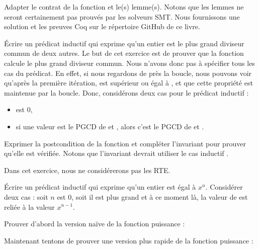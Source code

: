 

Adapter le contrat de la fonction et le(s) lemme(s). Notons que les lemmes ne
seront certainement pas prouvés par les solveurs SMT. Nous fournissons une solution
et les preuves Coq sur le répertoire GitHub de ce livre.





Écrire un prédicat inductif qui exprime qu'un entier est le plus grand diviseur
commun de deux autres. Le but de cet exercice est de prouver que la fonction
 calcule le plus grand diviseur commun. Nous n'avons donc pas
à spécifier tous les cas du prédicat. En effet, si nous regardons de près la boucle,
nous pouvons voir qu'après la première itération,  est supérieur ou
égal à , et que cette propriété est maintenue par la boucle. Donc,
considérons deux cas pour le prédicat inductif :

\begin{itemize}
\item {} est 0,
\item si une valeur  est le PGCD de  et ,
      alors c'est le PGCD de  et .
\end{itemize}




Exprimer la postcondition de la fonction et compléter l'invariant pour prouver
qu'elle est vérifiée. Notons que l'invariant devrait utiliser le cas inductif
.





Dans cet exercice, nous ne considérerons pas les RTE.


Écrire un prédicat inductif qui exprime qu'un entier  est égal
à $x^n$. Considérer deux cas : soit $n$ est 0, soit il est plus grand et à ce moment
là, la valeur de  est reliée à la valeur $x^{n-1}$.




Prouver d'abord la version naïve de la fonction puissance :




Maintenant tentons de prouver une version plus rapide de la fonction puissance :


